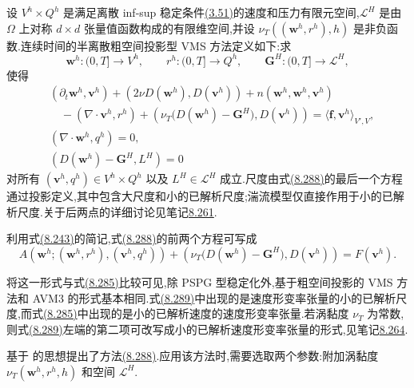 \begin{note}
\label{note:vms-coarse-projection-method}
设 $V^h\times Q^h$ 是满足离散 inf-sup 稳定条件\hyperref[eq:discrete-infsup-condition]{(3.51)}的速度和压力有限元空间,$\mathcal L^H$ 是由 $\Omega$ 上对称 $d\times d$ 张量值函数构成的有限维空间,并设 $\nu_T((\bm w^h,r^h),h)$ 是非负函数.连续时间的半离散粗空间投影型 VMS 方法定义如下:求
\[
 \bm w^h:(0,T]\to V^h,\qquad
 r^h:(0,T]\to Q^h,\qquad
 \bm G^H:(0,T]\to\mathcal L^H,
\]
使得
\begin{equation}\label{eq:vms-coarse-projection-three-scale-method}
\begin{aligned}
 &(\partial_t\bm w^h,\bm v^h)
 +(2\nu D(\bm w^h),D(\bm v^h))
 +n(\bm w^h,\bm w^h,\bm v^h)\\
 &\quad-(\nabla\cdot\bm v^h,r^h)
 +(\nu_T\bigl(D(\bm w^h)-\bm G^H\bigr),D(\bm v^h))
 =\langle\bm f,\bm v^h\rangle_{V',V},\\
 &(\nabla\cdot\bm w^h,q^h)=0,\\
 &(D(\bm w^h)-\bm G^H,L^H)=0
\end{aligned}
\end{equation}
对所有 $(\bm v^h,q^h)\in V^h\times Q^h$ 以及 $L^H\in\mathcal L^H$ 成立.尺度由式\hyperref[eq:vms-coarse-projection-three-scale-method]{(8.288)}的最后一个方程通过投影定义,其中包含大尺度和小的已解析尺度;湍流模型仅直接作用于小的已解析尺度.关于后两点的详细讨论见笔记\hyperref[note:vms-coarse-projection-large-space]{8.261}.

利用式\hyperref[eq:variational-navier-stokes-weak-form]{(8.243)}的简记,式\hyperref[eq:vms-coarse-projection-three-scale-method]{(8.288)}的前两个方程可写成
\begin{equation}\label{eq:vms-coarse-projection-short-form}
 A(\bm w^h;(\bm w^h,r^h),(\bm v^h,q^h))
 +(\nu_T\bigl(D(\bm w^h)-\bm G^H\bigr),D(\bm v^h))
 =F(\bm v^h).
\end{equation}

将这一形式与式\hyperref[eq:vms-avm3-short-form]{(8.285)}比较可见,除 PSPG 型稳定化外,基于粗空间投影的 VMS 方法和 AVM3 的形式基本相同.式\hyperref[eq:vms-coarse-projection-short-form]{(8.289)}中出现的是速度形变率张量的小的已解析尺度,而式\hyperref[eq:vms-avm3-short-form]{(8.285)}中出现的是小的已解析速度的速度形变率张量.若涡黏度 $\nu_T$ 为常数,则式\hyperref[eq:vms-coarse-projection-short-form]{(8.289)}左端的第二项可改写成小的已解析速度形变率张量的形式,见笔记\hyperref[note:vms-coarse-projection-constant-viscosity]{8.264}.

\textcite{JohnKaya2005} 基于 \textcite{Layton2002} 的思想提出了方法\hyperref[eq:vms-coarse-projection-three-scale-method]{(8.288)}.应用该方法时,需要选取两个参数:附加涡黏度 $\nu_T(\bm w^h,r^h,h)$ 和空间 $\mathcal L^H$.
\end{note}

